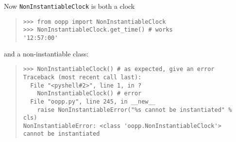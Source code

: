 \documentclass[10pt,english]{article}
\begin{document}
Now \texttt{NonInstantiableClock} is both a clock
\begin{quote}
\begin{verbatim}>>> from oopp import NonInstantiableClock
>>> NonInstantiableClock.get_time() # works
'12:57:00' \end{verbatim}
\end{quote}

and a non-instantiable class:
\begin{quote}
\begin{verbatim}>>> NonInstantiableClock() # as expected, give an error
Traceback (most recent call last):
  File "<pyshell#2>", line 1, in ?
    NonInstantiableClock() # error
  File "oopp.py", line 245, in __new__
    raise NonInstantiableError("%s cannot be instantiated" % cls)
NonInstantiableError: <class 'oopp.NonInstantiableClock'> 
cannot be instantiated\end{verbatim}
\end{quote}
\end{document}
